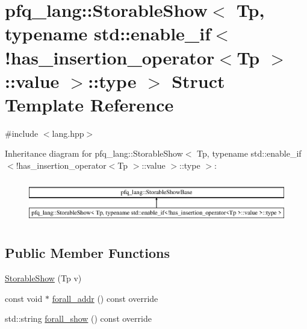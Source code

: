 \hypertarget{structpfq__lang_1_1StorableShow_3_01Tp_00_01typename_01std_1_1enable__if_3_9has__insertion__operc98e9de6b381c730d9d28da7df10d016}{\section{pfq\+\_\+lang\+:\+:Storable\+Show$<$ Tp, typename std\+:\+:enable\+\_\+if$<$!has\+\_\+insertion\+\_\+operator$<$Tp $>$\+:\+:value $>$\+:\+:type $>$ Struct Template Reference}
\label{structpfq__lang_1_1StorableShow_3_01Tp_00_01typename_01std_1_1enable__if_3_9has__insertion__operc98e9de6b381c730d9d28da7df10d016}
}


{\ttfamily \#include $<$lang.\+hpp$>$}

Inheritance diagram for pfq\+\_\+lang\+:\+:Storable\+Show$<$ Tp, typename std\+:\+:enable\+\_\+if$<$!has\+\_\+insertion\+\_\+operator$<$Tp $>$\+:\+:value $>$\+:\+:type $>$\+:\begin{figure}[H]
\begin{center}
\leavevmode
\includegraphics[height=1.917808cm]{structpfq__lang_1_1StorableShow_3_01Tp_00_01typename_01std_1_1enable__if_3_9has__insertion__operc98e9de6b381c730d9d28da7df10d016}
\end{center}
\end{figure}
\subsection*{Public Member Functions}
\begin{DoxyCompactItemize}
\item 
\hyperlink{structpfq__lang_1_1StorableShow_3_01Tp_00_01typename_01std_1_1enable__if_3_9has__insertion__operc98e9de6b381c730d9d28da7df10d016_aa1c419e6174b34eec53430c6f2a479a2}{Storable\+Show} (Tp v)
\item 
const void $\ast$ \hyperlink{structpfq__lang_1_1StorableShow_3_01Tp_00_01typename_01std_1_1enable__if_3_9has__insertion__operc98e9de6b381c730d9d28da7df10d016_a1d2ff6a788af963ba952a4d83dac48c7}{forall\+\_\+addr} () const override
\item 
std\+::string \hyperlink{structpfq__lang_1_1StorableShow_3_01Tp_00_01typename_01std_1_1enable__if_3_9has__insertion__operc98e9de6b381c730d9d28da7df10d016_aba784c55c209b0c780bc9deca4e698e8}{forall\+\_\+show} () const override
\end{DoxyCompactItemize}
